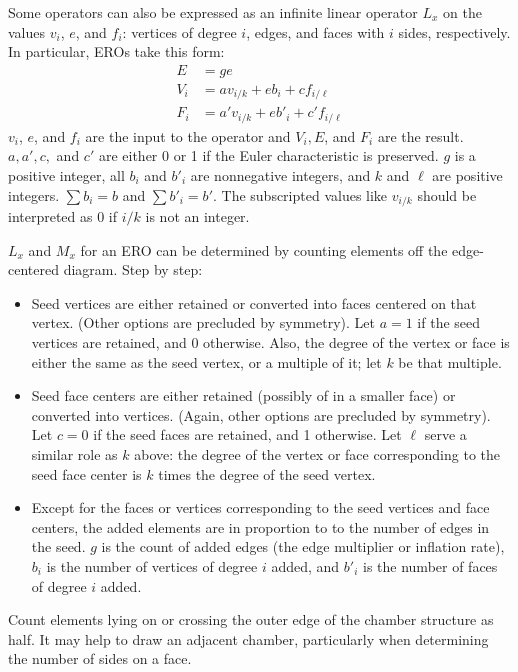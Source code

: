 \documentclass{amsart}[12pt]
\begin{document}
Some operators can also be expressed as an infinite linear operator $L_x$ on
the values $v_i$, $e$, and $f_i$: vertices of degree $i$, edges, and faces with $i$ sides, respectively. In particular, EROs take this form:
\begin{equation}
  \begin{split}
  E & = ge \\
  V_i & = a v_{i/k} + e b_i + c f_{i/\ell} \\
  F_i & = a' v_{i/k} + e b'_i + c' f_{i/\ell}
  \end{split}
\end{equation}
$v_i$, $e$, and $f_i$ are the input to the operator and $V_i, E$, and $F_i$ are
the result. $a, a', c,$ and $c'$ are either 0 or 1 if the Euler characteristic
is preserved. $g$ is a positive integer, all $b_i$ and $b'_i$ are nonnegative
integers, and $k$ and $\ell$ are positive integers.
$\sum b_i = b$ and $\sum b'_i = b'$. The subscripted
values like $v_{i/k}$ should be interpreted as 0 if $i/k$ is not an integer.

$L_x$ and $M_x$ for an ERO can be determined by counting elements off the
edge-centered diagram. Step by step:
\begin{itemize}
\item Seed vertices are either retained or converted into faces centered on that
  vertex. (Other options are precluded by symmetry). Let $a = 1$ if the
  seed vertices are retained, and 0 otherwise. Also, the degree of the vertex
  or face is either the same as the seed vertex, or a multiple of it;
  let $k$ be that multiple.
\item Seed face centers are either retained (possibly of in a smaller face) or
  converted into vertices. (Again, other options are precluded by symmetry).
  Let $c = 0$ if the seed faces are retained, and 1 otherwise. Let
  $\ell$ serve a similar role as $k$ above: the degree of the vertex
  or face corresponding to the seed face center is $k$ times the degree of
  the seed vertex.
\item Except for the faces or vertices corresponding to the seed vertices and face
  centers, the added elements are in proportion to to the number of edges in the
  seed. $g$ is the count of added edges (the edge multiplier or inflation
  rate), $b_i$ is the number of vertices of degree $i$ added, and
  $b'_i$ is the number of faces of degree $i$ added.
\end{itemize}
Count elements lying on or crossing the outer edge of the chamber structure as
half. It may help to draw an adjacent chamber, particularly when determining
the number of sides on a face.
\end{document}
